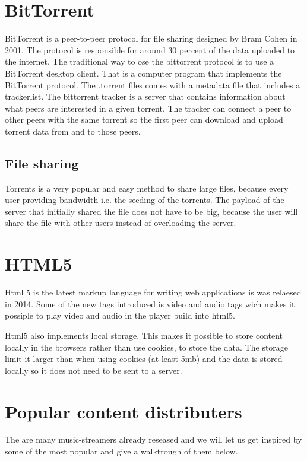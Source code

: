 \section{BitTorrent}
BitTorrent \citep{bittorrent:bep03} is a peer-to-peer protocol for file sharing designed by Bram Cohen in 2001.
The protocol is responsible for around 30 percent of the data uploaded to the internet.
The traditional way to ose the bittorrent protocol is to use a BitTorrent desktop client. That is a computer program that implements the BitTorrent protocol.
The .torrent files comes with a metadata file that includes a trackerlist. The bittorrent tracker is a server that contains information about what peers are interested in a given torrent. The tracker can connect a peer to other peers with the same torrent so the first peer can download and upload torrent data from and to those peers.

\subsection{File sharing}
Torrents is a very popular and easy method to share large files, because every user providing bandwidth i.e. the seeding of the torrents.
The payload of the server that initially shared the file does not have to be big, because the user will share the file with other users instead of overloading the server.

\section{\acs{HTML}5}
Html 5 is the latest markup language for writing web applications is was relaesed in 2014. Some of the new tags introduced is video and audio tags wich makes it possiple to play video and audio in the player build into html5.

Html5 also implements local storage. This makes it possible to store content locally in the browsers rather than use cookies, to store the data.
The storage limit it larger than when using cookies (at least 5mb) and the data is stored locally so it does not need to be sent to a server.

\section{Popular content distributers}
The are many music-streamers already reseased and we will let us get inspired by some of the most popular and give a walktrough of them below.

